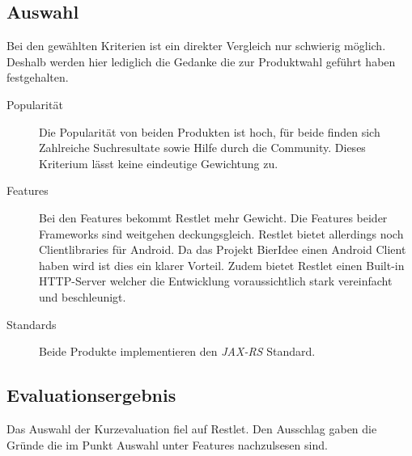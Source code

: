 \documentclass[10pt,a4paper]{scrartcl}
\begin{document}
\subsection{Auswahl}
Bei den gewählten Kriterien ist ein direkter Vergleich nur schwierig möglich. Deshalb werden hier lediglich die Gedanke die zur Produktwahl geführt haben festgehalten.

\begin{description}
	\item[Popularität]Die Popularität von beiden Produkten ist hoch, für beide finden sich Zahlreiche Suchresultate sowie Hilfe durch die Community. Dieses Kriterium lässt keine eindeutige Gewichtung zu.
	\item[Features]Bei den Features bekommt Restlet mehr Gewicht. Die Features beider Frameworks sind weitgehen deckungsgleich. Restlet bietet allerdings noch Clientlibraries für Android. Da das Projekt BierIdee einen Android Client haben wird ist dies ein klarer Vorteil. Zudem bietet Restlet einen Built-in HTTP-Server welcher die Entwicklung voraussichtlich stark vereinfacht und beschleunigt.
	\item[Standards]Beide Produkte implementieren den \textit{JAX-RS} Standard.
\end{description}

\subsection{Evaluationsergebnis}
Das Auswahl der Kurzevaluation fiel auf Restlet. Den Ausschlag gaben die Gründe die im Punkt Auswahl unter Features nachzulsesen sind.
\end{document}
